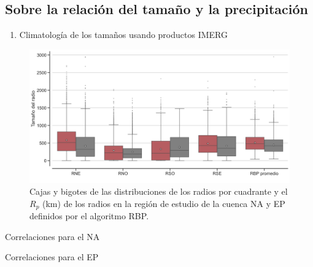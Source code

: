 \subsection{Sobre la relación del tamaño y la precipitación}
\begin{frame}
\begin{enumerate}
\setcounter{enumi}{0}
    \item Climatología de los tamaños usando productos IMERG
\end{enumerate}
    \begin{figure}
        \centering
        \includegraphics[scale = 0.3]{Images/Figures/Fig_3_13.jpeg}
        \caption{Cajas y bigotes de las distribuciones de los radios por cuadrante y el $R_p$ (km) de los radios en la región de estudio de la cuenca {\red NA} y {\gray EP} definidos por el algoritmo RBP.}
        \label{fig:fig_13}
    \end{figure}
\end{frame}

\begin{frame}
    \begin{exampleblock}{Correlaciones para el NA}
        
    \end{exampleblock}
\end{frame}

\begin{frame}
    \begin{alertblock}{Correlaciones para el EP}
        
    \end{alertblock}
\end{frame}

